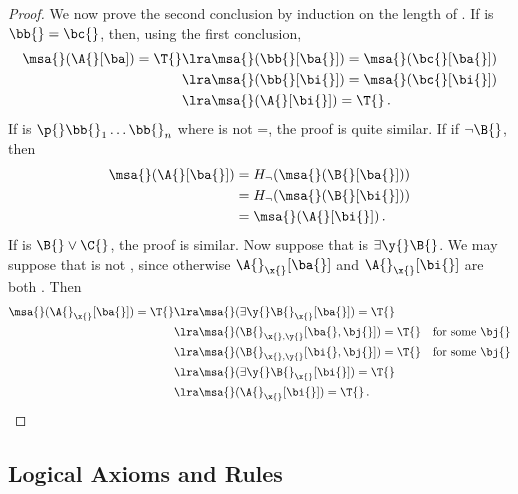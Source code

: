 \begin{proof}
    We now prove the second conclusion by induction on the length of \A{}.
    If \A{} is $\bb{} = \bc{}$, then, using the first conclusion,
    \begin{align}
        \msa{}(\A{}[\ba]) = \T{}
            &\lra \msa{}(\bb{}[\ba{}]) = \msa{}(\bc{}[\ba{}]) \\
            &\lra \msa{}(\bb{}[\bi{}]) = \msa{}(\bc{}[\bi{}]) \\
            &\lra \msa{}(\A{}[\bi{}]) = \T{}\,.
    \end{align}
    If \A{} is $\p{} \bb{}_1 \dots \bb{}_n$ where \p{} is not =, the proof is quite similar.
    If \A{} if $\neg \B{}$, then
    \begin{align}
        \msa{}(\A{}[\ba{}])
            &= H_\neg (\msa{} (\B{}[\ba{}])) \\
            &= H_\neg (\msa{} (\B{}[\bi{}])) \\
            &= \msa{} (\A{}[\bi{}])\,.
    \end{align}
    If \A{} is $\B{} \vee \C{}$, the proof is similar.
    Now suppose that \A{} is $\exists \y{} \B{}$.
    We may suppose that \y{} is not \x{}, since otherwise $\A{}_\x{}[\ba{}]$ and $\A{}_\x{}[\bi{}]$ are both \A{}.
    Then
    \begin{align}
        \msa{}(\A{}_\x{}[\ba{}]) = \T{}
            &\lra \msa{}(\exists \y{} \B{}_\x{} [\ba{}]) = \T{} \\
            &\lra \msa{}(\B{}_{\x{},\y{}} [\ba{}, \bj{}]) = \T{} \quad \text{for some \bj{}} \\
            &\lra \msa{}(\B{}_{\x{},\y{}} [\bi{}, \bj{}]) = \T{} \quad \text{for some \bj{}} \\
            &\lra \msa{}(\exists \y{} \B{}_\x{} [\bi{}]) = \T{} \\
            &\lra \msa{} (\A{}_\x{}[\bi{}]) = \T{}\,.
    \end{align}
\end{proof}


\subsection{Logical Axioms and Rules}


